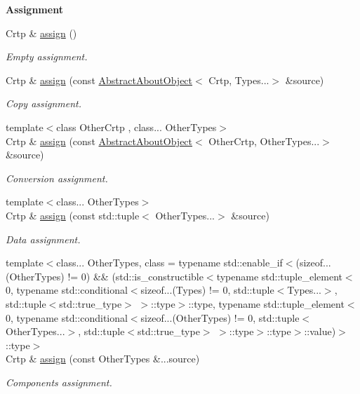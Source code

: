 \begin{Indent}{\bf Assignment}\par
\begin{DoxyCompactItemize}
\item 
Crtp \& \hyperlink{classmagrathea_1_1AbstractAboutObject_a3f69141251fd871a5bb2d75f69e0970d}{assign} ()
\begin{DoxyCompactList}\small\item\em Empty assignment. \end{DoxyCompactList}\item 
Crtp \& \hyperlink{classmagrathea_1_1AbstractAboutObject_a5c2688f75ecb7527c4297701a1a63840}{assign} (const \hyperlink{classmagrathea_1_1AbstractAboutObject}{Abstract\-About\-Object}$<$ Crtp, Types...$>$ \&source)
\begin{DoxyCompactList}\small\item\em Copy assignment. \end{DoxyCompactList}\item 
{\footnotesize template$<$class Other\-Crtp , class... Other\-Types$>$ }\\Crtp \& \hyperlink{classmagrathea_1_1AbstractAboutObject_af99a6e4896138fbdc9fd2fe54bb93295}{assign} (const \hyperlink{classmagrathea_1_1AbstractAboutObject}{Abstract\-About\-Object}$<$ Other\-Crtp, Other\-Types...$>$ \&source)
\begin{DoxyCompactList}\small\item\em Conversion assignment. \end{DoxyCompactList}\item 
{\footnotesize template$<$class... Other\-Types$>$ }\\Crtp \& \hyperlink{classmagrathea_1_1AbstractAboutObject_ab25168e634e9d37d13a79c1896feeb5b}{assign} (const std\-::tuple$<$ Other\-Types...$>$ \&source)
\begin{DoxyCompactList}\small\item\em Data assignment. \end{DoxyCompactList}\item 
{\footnotesize template$<$class... Other\-Types, class  = typename std\-::enable\-\_\-if$<$(sizeof...(\-Other\-Types) != 0) \&\& (std\-::is\-\_\-constructible$<$typename std\-::tuple\-\_\-element$<$0, typename std\-::conditional$<$sizeof...(\-Types) != 0, std\-::tuple$<$\-Types...$>$, std\-::tuple$<$std\-::true\-\_\-type$>$ $>$\-::type$>$\-::type, typename std\-::tuple\-\_\-element$<$0, typename std\-::conditional$<$sizeof...(\-Other\-Types) != 0, std\-::tuple$<$\-Other\-Types...$>$, std\-::tuple$<$std\-::true\-\_\-type$>$ $>$\-::type$>$\-::type$>$\-::value)$>$\-::type$>$ }\\Crtp \& \hyperlink{classmagrathea_1_1AbstractAboutObject_ab5e22a5b49218cfbe0a3590311550ae5}{assign} (const Other\-Types \&...source)
\begin{DoxyCompactList}\small\item\em Components assignment. \end{DoxyCompactList}\end{DoxyCompactItemize}
\end{Indent}
